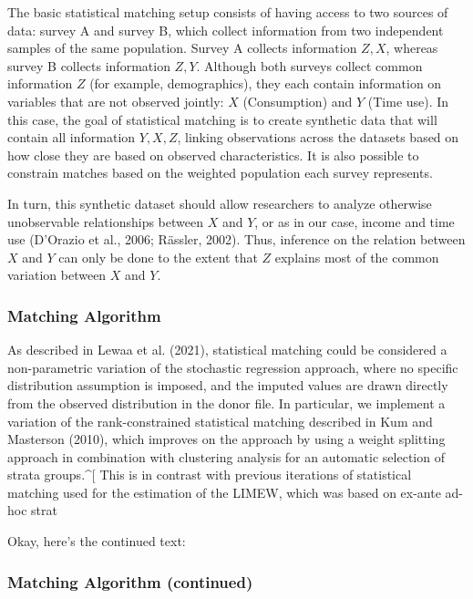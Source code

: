 \documentclass[
  11pt,
]{article}
\begin{document}
The basic statistical matching setup consists of having access to two
sources of data: survey A and survey B, which collect information from
two independent samples of the same population. Survey A collects
information \(Z, X\), whereas survey B collects information \(Z, Y\).
Although both surveys collect common information \(Z\) (for example,
demographics), they each contain information on variables that are not
observed jointly: \(X\) (Consumption) and \(Y\) (Time use). In this
case, the goal of statistical matching is to create synthetic data that
will contain all information \(Y,X, Z\), linking observations across the
datasets based on how close they are based on observed characteristics.
It is also possible to constrain matches based on the weighted
population each survey represents.

In turn, this synthetic dataset should allow researchers to analyze
otherwise unobservable relationships between \(X\) and \(Y\), or as in
our case, income and time use (D'Orazio et al., 2006; Rässler, 2002).
Thus, inference on the relation between \(X\) and \(Y\) can only be done
to the extent that \(Z\) explains most of the common variation between
\(X\) and \(Y\).

\subsubsection{Matching Algorithm}\label{matching-algorithm}

As described in Lewaa et al. (2021), statistical matching could be
considered a non-parametric variation of the stochastic regression
approach, where no specific distribution assumption is imposed, and the
imputed values are drawn directly from the observed distribution in the
donor file. In particular, we implement a variation of the
rank-constrained statistical matching described in Kum and Masterson
(2010), which improves on the approach by using a weight splitting
approach in combination with clustering analysis for an automatic
selection of strata groups.\^{}{[} This is in contrast with previous
iterations of statistical matching used for the estimation of the LIMEW,
which was based on ex-ante ad-hoc strat

Okay, here's the continued text:

\subsubsection{Matching Algorithm
(continued)}\label{matching-algorithm-continued}
\end{document}
